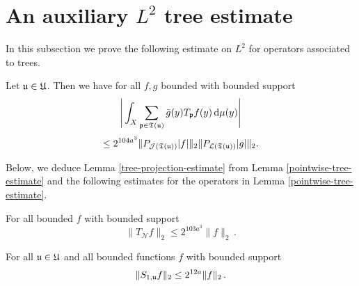 {\section{An auxiliary \texorpdfstring{$L^2$}{L2} tree estimate}

In this subsection we prove the following estimate on $L^2$ for operators associated to trees.

\begin{lemma}
    \label{tree-projection-estimate}
    Let ${\mathfrak u} \in {\mathfrak U}$.
    Then we have for all $f, g$ bounded with bounded support
    $$
        \Bigg|\int_X \sum_{{\mathfrak p} \in {\mathfrak T}({\mathfrak u})} \bar g(y) T_{{\mathfrak p}}f(y) \, \mathrm{d}\mu(y)  \Bigg|
    $$
    \begin{equation}
        \label{eq-tree-est}
         \le 2^{104a^3}\|P_{\mathcal{J}({\mathfrak T}({\mathfrak u}))}|f|\|_{2}\|P_{\mathcal{L}({\mathfrak T}({\mathfrak u}))}|g|\|_{2}.
    \end{equation}
\end{lemma}

Below, we deduce Lemma \ref{tree-projection-estimate} from Lemma \ref{pointwise-tree-estimate} and the following estimates for the operators in Lemma \ref{pointwise-tree-estimate}.

\begin{lemma}
    \label{nontangential-operator-bound}
    For all bounded $f$ with bounded support
    $$
        \|T_{\mathcal{N}} f\|_2 \le 2^{103a^3} \|f\|_2\,.
    $$
\end{lemma}

\begin{lemma}
    \label{boundary-operator-bound}
    For all ${\mathfrak u} \in {\mathfrak U}$ and all bounded functions $f$ with bounded support
    \begin{equation}
        \label{eq-S-bound}
        \|S_{1,{\mathfrak u}}f\|_2 \le 2^{12a} \|f\|_2\,.
    \end{equation}
\end{lemma}

}
